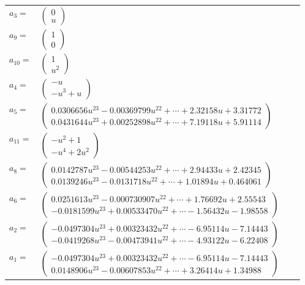\documentclass[1p]{elsarticle_modified}
\theoremstyle{definition}
\begin{document}
\begin{tabular}{m{7pt} m{180pt} m{7pt} m{180pt} }
\flushright $a_{3}=$&$\begin{pmatrix}0\\u\end{pmatrix}$ \\
\flushright $a_{9}=$&$\begin{pmatrix}1\\0\end{pmatrix}$ \\
\flushright $a_{10}=$&$\begin{pmatrix}1\\u^2\end{pmatrix}$ \\
\flushright $a_{4}=$&$\begin{pmatrix}- u\\- u^3+u\end{pmatrix}$ \\
\flushright $a_{5}=$&$\begin{pmatrix}0.0306656 u^{23}-0.00369799 u^{22}+\cdots+2.32158 u+3.31772\\0.0431644 u^{23}+0.00252898 u^{22}+\cdots+7.19118 u+5.91114\end{pmatrix}$ \\
\flushright $a_{11}=$&$\begin{pmatrix}- u^2+1\\- u^4+2 u^2\end{pmatrix}$ \\
\flushright $a_{8}=$&$\begin{pmatrix}0.0142787 u^{23}-0.00544253 u^{22}+\cdots+2.94433 u+2.42345\\0.0139246 u^{23}-0.0131718 u^{22}+\cdots+1.01894 u+0.464061\end{pmatrix}$ \\
\flushright $a_{6}=$&$\begin{pmatrix}0.0251613 u^{23}-0.000730907 u^{22}+\cdots+1.76692 u+2.55543\\-0.0181599 u^{23}+0.00533470 u^{22}+\cdots-1.56432 u-1.98558\end{pmatrix}$ \\
\flushright $a_{2}=$&$\begin{pmatrix}-0.0497304 u^{23}+0.00323432 u^{22}+\cdots-6.95114 u-7.14443\\-0.0419268 u^{23}-0.00473941 u^{22}+\cdots-4.93122 u-6.22408\end{pmatrix}$ \\
\flushright $a_{1}=$&$\begin{pmatrix}-0.0497304 u^{23}+0.00323432 u^{22}+\cdots-6.95114 u-7.14443\\0.0148906 u^{23}-0.00607853 u^{22}+\cdots+3.26414 u+1.34988\end{pmatrix}$ \\

\end{tabular}
\end{document}
